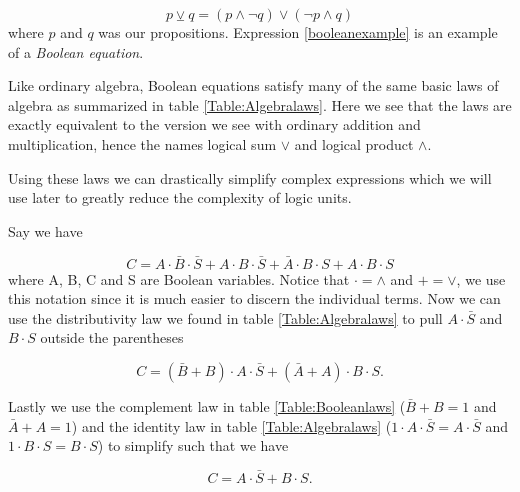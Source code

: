             \begin{equation}
                \label{booleanexample}
                p \veebar q = (p \wedge \neg q) \vee (\neg p \wedge q)
            \end{equation}
            where $p$ and $q$ was our propositions. Expression \ref{booleanexample} is an example of a \textit{Boolean equation}. 
            
            Like ordinary algebra, Boolean equations satisfy many of the same basic laws of algebra as summarized in table \ref{Table:Algebralaws}. Here we see that the laws are exactly equivalent to the version we see with ordinary addition and multiplication, hence the names logical sum $\vee$ and logical product $\wedge$.
            
            Using these laws we can drastically simplify complex expressions which we will use later to greatly reduce the complexity of logic units. 
            
            Say we have 
            
            \begin{equation}
               \label{simplify}
                C = A \cdot \bar{B} \cdot \bar{S} + A \cdot B \cdot \bar{S} + \bar{A} \cdot B \cdot S
                  + A \cdot B \cdot S
            \end{equation}
            where A, B, C and S are Boolean variables. Notice that $\cdot = \wedge$ and $+ = \vee$, we use this notation since it is much easier to discern the individual terms. Now we can use the distributivity law we found in table \ref{Table:Algebralaws} to pull $A\cdot \bar{S}$ and $B \cdot S$ outside the parentheses
            
            \begin{equation}
                C = (\bar{B} + B) \cdot A\cdot \bar{S} + (\bar{A} + A)\cdot B\cdot S.
            \end{equation}
            
            Lastly we use the complement law in table \ref{Table:Booleanlaws} ($\bar{B} + B = 1$ and $\bar{A} + A = 1$) and the identity law in table \ref{Table:Algebralaws} ($1 \cdot A\cdot \bar{S} = A\cdot \bar{S}$ and $1 \cdot B\cdot S = B\cdot S$) to simplify such that we have
            
            \begin{equation}
                \label{simplify2}
                C = A\cdot \bar{S} + B\cdot S.
            \end{equation}
            
